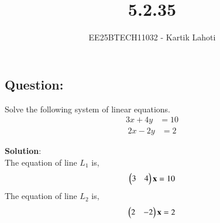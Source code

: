 \documentclass[journal]{IEEEtran}
\begin{document}

\vspace{3cm}

\title{5.2.35}
\author{EE25BTECH11032 - Kartik Lahoti}
\maketitle

\subsection*{Question: } 
Solve the following system of linear equations.
\begin{align*}
    3x+4y &= 10
\end{align*}
\begin{align*}
    2x - 2y &= 2
\end{align*}



\textbf{Solution}:\\
The equation of line $L_1$ is,
\begin{align}
    \begin{pmatrix}3 & 4\end{pmatrix}\mathbf{x} = 10
\end{align}
The equation of line $L_2$ is,
\begin{align}
    \begin{pmatrix}2 & -2\end{pmatrix}\mathbf{x} = 2
\end{align}
\end{document}
